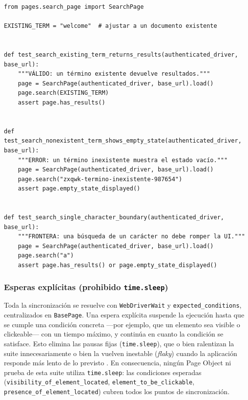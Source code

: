\documentclass[12pt]{article}
\begin{document}
\begin{lstlisting}[style=py,caption={\texttt{tests/test\_search.py} --- pruebas de búsqueda.},captionpos=b]
from pages.search_page import SearchPage

EXISTING_TERM = "welcome"  # ajustar a un documento existente


def test_search_existing_term_returns_results(authenticated_driver, base_url):
    """VÁLIDO: un término existente devuelve resultados."""
    page = SearchPage(authenticated_driver, base_url).load()
    page.search(EXISTING_TERM)
    assert page.has_results()


def test_search_nonexistent_term_shows_empty_state(authenticated_driver, base_url):
    """ERROR: un término inexistente muestra el estado vacío."""
    page = SearchPage(authenticated_driver, base_url).load()
    page.search("zxqwk-termino-inexistente-987654")
    assert page.empty_state_displayed()


def test_search_single_character_boundary(authenticated_driver, base_url):
    """FRONTERA: una búsqueda de un carácter no debe romper la UI."""
    page = SearchPage(authenticated_driver, base_url).load()
    page.search("a")
    assert page.has_results() or page.empty_state_displayed()
\end{lstlisting}

\subsubsection{Esperas explícitas (prohibido \texttt{time.sleep})}

Toda la sincronización se resuelve con \texttt{WebDriverWait} y
\texttt{expected\_conditions}, centralizados en \texttt{BasePage}. Una espera
explícita suspende la ejecución hasta que se cumple una condición concreta
---por ejemplo, que un elemento sea visible o clickeable--- con un tiempo máximo,
y continúa en cuanto la condición se satisface. Esto elimina las pausas fijas
(\texttt{time.sleep}), que o bien ralentizan la suite innecesariamente o bien la
vuelven inestable (\textit{flaky}) cuando la aplicación responde más lento de lo
previsto \citep{garcia2022, seleniumdocs}. En consecuencia, ningún Page Object ni
prueba de esta suite utiliza \texttt{time.sleep}: las condiciones esperadas
(\texttt{visibility\_of\_element\_located}, \texttt{element\_to\_be\_clickable},
\texttt{presence\_of\_element\_located}) cubren todos los puntos de
sincronización.
\end{document}
